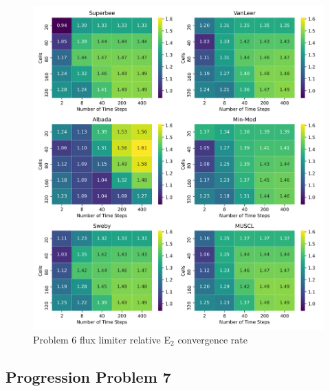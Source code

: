 \clearpage

\begin{figure}[p]
    \centering
    \includegraphics[width=6in]{images/chapter-5/progressionProblems/problem6/problem6E2FluxLimiterConvergenceRate.png}
    \caption{Problem 6 flux limiter relative E${}_{2}$ convergence rate}
    \label{fig:problem6_l2error_fluxlimiter_convergence_rate}
\end{figure}

\clearpage

\subsection{Progression Problem 7}

